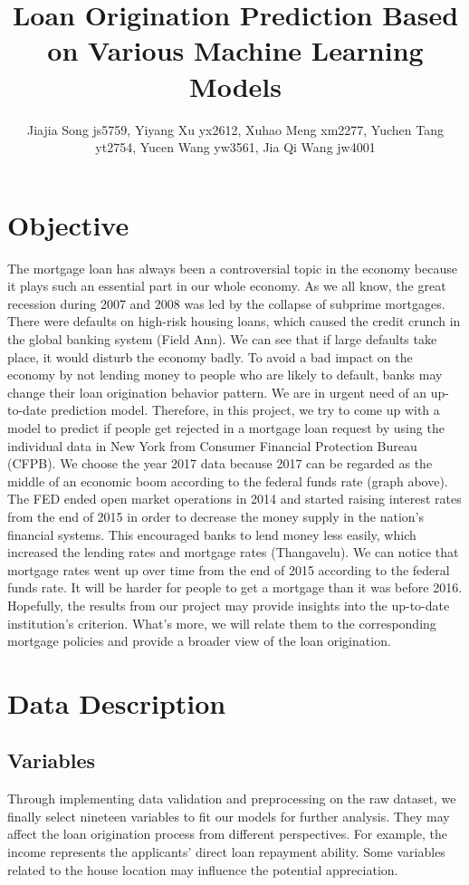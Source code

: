 \documentclass{jpp}
\title{Loan Origination Prediction
 Based on Various Machine Learning Models}
\author{Jiajia Song\aff{1} js5759,
  Yiyang Xu\aff{1} yx2612,
  Xuhao Meng\aff{1} xm2277,
  Yuchen Tang\aff{1} yt2754,
  Yucen Wang\aff{1} yw3561,
  Jia Qi Wang\aff{1} jw4001}
\affiliation{\aff{1}Department of Statistics, Columbia University}
\begin{document}
\maketitle

\section{Objective}

The mortgage loan has always been a controversial topic in the economy because it plays such an essential part in our whole economy. As we all know, the great recession during 2007 and 2008 was led by the collapse of subprime mortgages. There were defaults on high-risk housing loans, which caused the credit crunch in the global banking system (Field Ann). We can see that if large defaults take place, it would disturb the economy badly. To avoid a bad impact on the economy by not lending money to people who are likely to default, banks may change their loan origination behavior pattern. We are in urgent need of an up-to-date prediction model. Therefore, in this project, we try to come up with a model to predict if people get rejected in a mortgage loan request by using the individual data in New York from Consumer Financial Protection Bureau (CFPB). We choose the year 2017 data because 2017 can be regarded as the middle of an economic boom according to the federal funds rate (graph above). The FED ended open market operations in 2014 and started raising interest rates from the end of 2015 in order to decrease the money supply in the nation's financial systems. This encouraged banks to lend money less easily, which increased the lending rates and mortgage rates (Thangavelu). We can notice that mortgage rates went up over time from the end of 2015 according to the federal funds rate. It will be harder for people to get a mortgage than it was before 2016. Hopefully, the results from our project may provide insights into the up-to-date institution’s criterion. What’s more, we will relate them to the corresponding mortgage policies and provide a broader view of the loan origination. 

\section{Data Description}
\subsection{Variables}

Through implementing data validation and preprocessing on the raw dataset, we finally select nineteen variables to fit our models for further analysis. They may affect the loan origination process from different perspectives. For example, the income represents the applicants’ direct loan repayment ability. Some variables related to the house location may influence the potential appreciation. 
\end{document}
